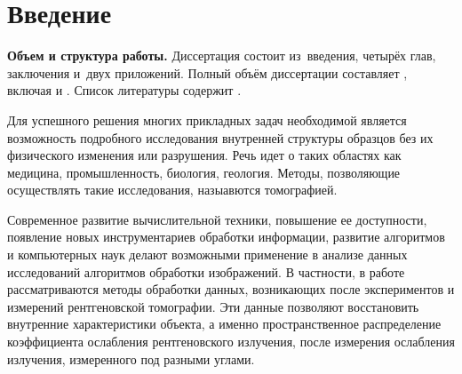 \chapter*{Введение}							%

\newcommand{\actuality}{}
\newcommand{\progress}{}
\newcommand{\aim}{{\textbf\aimTXT}}
\newcommand{\tasks}{\textbf{\tasksTXT}}
\newcommand{\novelty}{\textbf{\noveltyTXT}}
\newcommand{\influence}{\textbf{\influenceTXT}}
\newcommand{\methods}{\textbf{\methodsTXT}}
\newcommand{\defpositions}{\textbf{\defpositionsTXT}}
\newcommand{\reliability}{\textbf{\reliabilityTXT}}
\newcommand{\probation}{\textbf{\probationTXT}}
\newcommand{\contribution}{\textbf{\contributionTXT}}
\newcommand{\publications}{\textbf{\publicationsTXT}}


\textbf{Объем и структура работы.} Диссертация состоит из~введения, четырёх глав, заключения и~двух приложений.
%
Полный объём диссертации составляет
, включая
 и
.   Список литературы содержит  
.

\actuality



Для успешного решения многих прикладных задач необходимой является возможность подробного исследования внутренней структуры образцов без их физического изменения или разрушения.
Речь идет о таких областях как медицина, промышленность, биология, геология. 
Методы, позволяющие осуществлять такие исследования, назыавются томографией.

Современное развитие вычислительной техники, повышение ее доступности, появление новых инструментариев обработки информации, развитие алгоритмов и компьютерных наук делают возможными применение в анализе данных исследований алгоритмов обработки изображений.
В частности, в работе рассматриваются методы обработки данных, возникающих после экспериментов и измерений рентгеновской томографии.
Эти данные позволяют восстановить внутренние характеристики объекта, а именно пространственное распределение коэффициента ослабления рентгеновского излучения, после измерения ослабления излучения, измеренного под разными углами.

